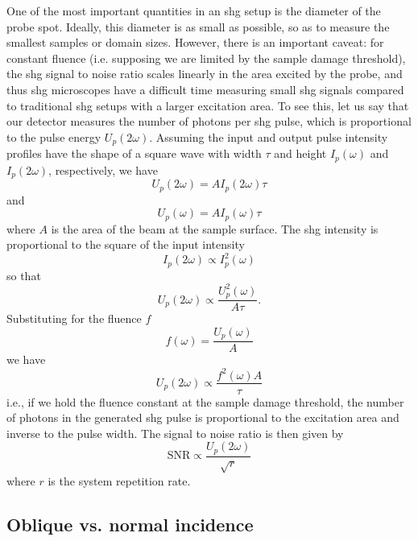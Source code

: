 One of the most important quantities in an \gls{shg} setup is the diameter of the probe spot.
Ideally, this diameter is as small as possible, so as to measure the smallest samples or domain sizes.
However, there is an important caveat: for constant fluence (i.e. supposing we are limited by the sample damage threshold), the \gls{shg} signal to noise ratio scales linearly in the area excited by the probe, and thus \gls{shg} microscopes have a difficult time measuring small \gls{shg} signals compared to traditional \gls{shg} setups with a larger excitation area.
To see this, let us say that our detector measures the number of photons per \gls{shg} pulse, which is proportional to the pulse energy $U_p(2\omega)$.
Assuming the input and output pulse intensity profiles have the shape of a square wave with width $\tau$ and height $I_p(\omega)$ and $I_p(2\omega)$, respectively, we have
\begin{equation}
U_p(2\omega) = A I_p(2\omega) \tau
\end{equation}
and
\begin{equation}
U_p(\omega) = A I_p(\omega) \tau
\end{equation}
where $A$ is the area of the beam at the sample surface.
The \gls{shg} intensity is proportional to the square of the input intensity
\begin{equation}
I_p(2\omega) \propto I_p^2(\omega)
\end{equation}
so that
\begin{equation}
U_p(2\omega) \propto \frac{U_p^2(\omega)}{A\tau}.
\end{equation}
Substituting for the fluence $f$
\begin{equation}
f(\omega) = \frac{U_p(\omega)}{A}
\end{equation}
we have
\begin{equation}
U_p(2\omega) \propto \frac{f^2(\omega)A}{\tau}
\end{equation}
i.e., if we hold the fluence constant at the sample damage threshold, the number of photons in the generated \gls{shg} pulse is proportional to the excitation area and inverse to the pulse width.
The signal to noise ratio is then given by
\begin{equation}
\mathrm{SNR} \propto \frac{U_p(2\omega)}{\sqrt{r}}
\end{equation}
where $r$ is the system repetition rate.

\subsection{Oblique vs. normal incidence}\label{sec:obliquevsnormal}

